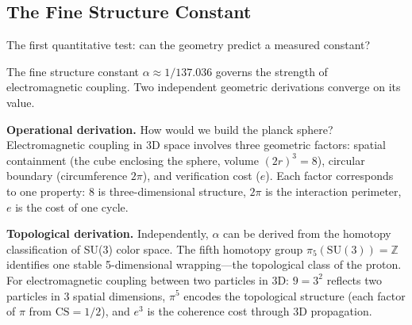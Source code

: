 \documentclass[12pt]{article}
\begin{document}
\subsection{The Fine Structure Constant}

The first quantitative test: can the geometry predict a measured constant?

The fine structure constant $\alpha \approx 1/137.036$ governs the strength of electromagnetic coupling. Two independent geometric derivations converge on its value.

\textbf{Operational derivation.} How would we build the planck sphere? Electromagnetic coupling in 3D space involves three geometric factors: spatial containment (the cube enclosing the sphere, volume $(2r)^3 = 8$), circular boundary (circumference $2\pi$), and verification cost ($e$). Each factor corresponds to one property: $8$ is three-dimensional structure, $2\pi$ is the interaction perimeter, $e$ is the cost of one cycle.

\textbf{Topological derivation.} Independently, $\alpha$ can be derived from the homotopy classification of SU(3) color space. The fifth homotopy group $\pi_5(\text{SU}(3)) = \mathbb{Z}$ identifies one stable 5-dimensional wrapping---the topological class of the proton. For electromagnetic coupling between two particles in 3D: $9 = 3^2$ reflects two particles in 3 spatial dimensions, $\pi^5$ encodes the topological structure (each factor of $\pi$ from $\mathrm{CS} = 1/2$), and $e^3$ is the coherence cost through 3D propagation.

\begin{center}
\end{center}
\end{document}
